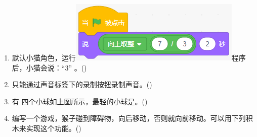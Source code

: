 \documentclass[10pt, a4paper]{article}
\newcommand{\hq}{\hfill(\qquad)}
\begin{document}
\begin{enumerate}
        \item 默认小猫角色，运行\includegraphics[width=.2\textwidth]{figure/30.png}程序后，小猫会说：“3” 。\hq

        \item 只能通过声音标签下的录制按钮录制声音。\hq

        \item 有    四个小球如上图所示，最轻的小球是。\hq

        \item 编写一个游戏，猴子碰到障碍物，向后移动，否则就向前移动。可以用下列积木来实现这个功能。\hq
        

\end{enumerate}
\end{document}
